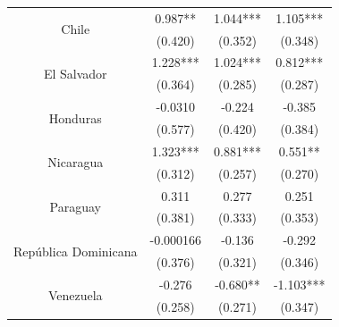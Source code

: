 \begin{table}[htbp]
\begin{tabular}{cccc}
    \midrule
    \multicolumn{1}{c}{\multirow{2}[2]{*}{Chile}} & 0.987** & 1.044*** & 1.105*** \\
          & (0.420) & (0.352) & (0.348) \\
    \midrule
    \multicolumn{1}{c}{\multirow{2}[2]{*}{El Salvador}} & 1.228*** & 1.024*** & 0.812*** \\
          & (0.364) & (0.285) & (0.287) \\
    \midrule
    \multicolumn{1}{c}{\multirow{2}[2]{*}{Honduras}} & -0.0310 & -0.224 & -0.385 \\
          & (0.577) & (0.420) & (0.384) \\
    \midrule
    \multicolumn{1}{c}{\multirow{2}[2]{*}{Nicaragua}} & 1.323*** & 0.881*** & 0.551** \\
          & (0.312) & (0.257) & (0.270) \\
    \midrule
    \multicolumn{1}{c}{\multirow{2}[2]{*}{Paraguay}} & 0.311 & 0.277 & 0.251 \\
          & (0.381) & (0.333) & (0.353) \\
    \midrule
    \multicolumn{1}{c}{\multirow{2}[2]{*}{República  Dominicana}} & -0.000166 & -0.136 & -0.292 \\
          & (0.376) & (0.321) & (0.346) \\
    \midrule
    \multicolumn{1}{c}{\multirow{2}[2]{*}{Venezuela}} & -0.276 & -0.680** & -1.103*** \\
          & (0.258) & (0.271) & (0.347) \\
    \bottomrule

    \end{tabular}%
  \label{por_pais}%
\end{table}%

